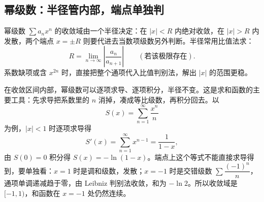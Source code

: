 \subsection{幂级数：半径管内部，端点单独判}

幂级数 $\sum a_{n}x^{n}$ 的收敛域由一个半径决定：在 $|x|<R$ 内绝对收敛，在 $|x|>R$ 内发散，两个端点 $x=\pm R$ 则要代进去当数项级数另外判断。半径常用比值法求：
\[
    R=\lim_{n\to\infty}\left|\frac{a_{n}}{a_{n+1}}\right|
    \qquad(\text{若该极限存在}).
\]
系数缺项或含 $x^{2n}$ 时，直接把整个通项代入比值判别法，解出 $|x|$ 的范围更稳。

在收敛区间内部，幂级数可以逐项求导、逐项积分，半径不变。这是求和函数的主要工具：先求导把系数里的 $n$ 消掉，凑成等比级数，再积分回去。以
\[
    S(x)=\sum_{n=1}^{\infty}\frac{x^{n}}{n}
\]
为例，$|x|<1$ 时逐项求导得
\[
    S'(x)=\sum_{n=1}^{\infty}x^{n-1}=\frac{1}{1-x},
\]
由 $S(0)=0$ 积分得 $S(x)=-\ln(1-x)$。端点上这个等式不能直接求导得到，要单独看：$x=1$ 时是调和级数，发散；$x=-1$ 时是交错级数 $\sum\dfrac{(-1)^{n}}{n}$，通项单调递减趋于零，由 Leibniz 判别法收敛，和为 $-\ln2$。所以收敛域是 $[-1,1)$，和函数在 $x=-1$ 处仍然连续。

